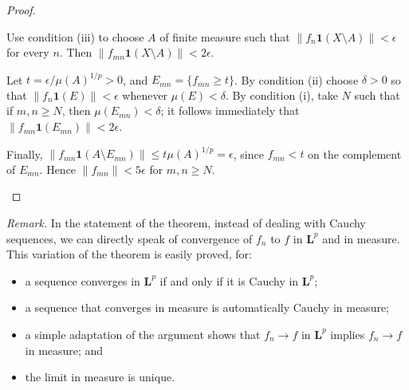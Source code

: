 \documentclass[12pt]{article}
\newcommand{\norm}[1]{\lVert#1\rVert}
\newcommand{\Le}{\mathbf{L}}
\newcommand{\indc}{\mathbf{1}}
\begin{document}
\begin{proof}
\begin{description}
Use condition (iii) to choose $A$ of finite measure
such that $\norm{f_n \indc(X \setminus A)} < \epsilon$
for every $n$.
Then $\norm{f_{mn} \indc(X \setminus A)} < 2 \epsilon$.

Let $t = \epsilon/\mu(A)^{1/p} > 0$,
and $E_{mn} = \{ f_{mn} \geq t \}$.
By condition (ii) choose $\delta > 0$ so that 
$\norm{f_n \indc(E)} < \epsilon$ whenever
$\mu(E) < \delta$.
By condition (i), take $N$ such that if $m, n \geq N$,
then
$\mu(E_{mn}) < \delta$;
it follows immediately that $\norm{ f_{mn} \indc(E_{mn}) } < 2\epsilon$.

Finally, $\norm{f_{mn} \indc(A \setminus E_{mn})} \leq t \mu(A)^{1/p} = \epsilon$, since $f_{mn} < t$ on the complement of $E_{mn}$.
Hence $\norm{f_{mn}} < 5\epsilon$ for $m, n \geq N$.
\qedhere
\end{description}
\end{proof}

\noindent
\emph{Remark.}  In the statement of the theorem, instead 
of dealing with Cauchy sequences,
we can directly speak of convergence of $f_n$ to $f$
in $\Le^p$ and in measure.
This variation of the theorem
is easily proved,
for:
\begin{itemize}
\item
a sequence converges in $\Le^p$ if and only if it is
Cauchy in $\Le^p$;
\item
a sequence that converges in measure is automatically Cauchy in measure;
\item
a simple adaptation of the argument
shows that $f_n \to f$ in $\Le^p$ implies $f_n \to f$ in measure; and
\item
the limit in measure is unique.
\end{itemize}


\end{document}
